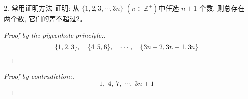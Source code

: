 \begin{frame}{}
  \begin{exampleblock}{$2.$ 常用证明方法}
    证明: 从 $\{1,2,3, \cdots, 3n\}\; (n \in \mathbb{Z}^{+})$中任选 $n+1$ 个数, 则总存在两个数, 它们的差不超过2。
  \end{exampleblock}

  \pause
  \begin{proof}[Proof by the pigeonhole principle:]
    \pause
    \[
      \{1,2,3\},\quad \{4,5,6\},\quad\cdots,\quad \{3n-2, 3n-1, 3n\}
    \]

  \end{proof}

  \pause
  \vspace{0.10cm}
  \begin{proof}[Proof by contradiction:]
    \pause
    \[
      1,\; 4,\; 7,\; \cdots,\; 3n + 1 
    \]
  \end{proof}
\end{frame}

%     
% 
% 
% 
